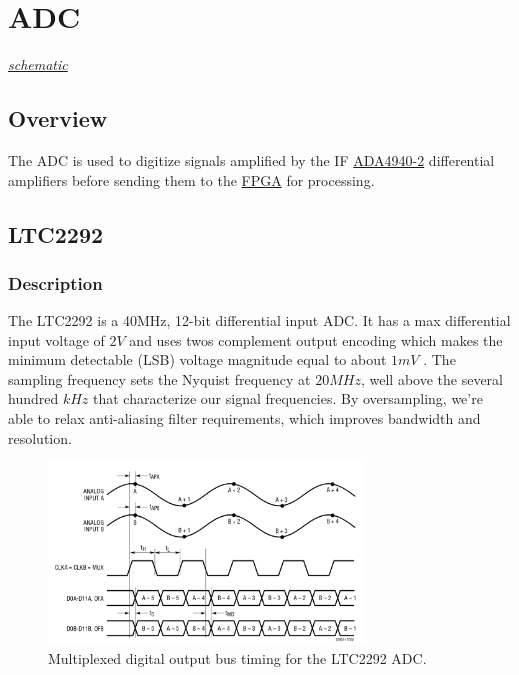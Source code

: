 \section{ADC}
\label{sec:adc}
\textit{\hyperlink{schematic.4}{schematic}}

\subsection{Overview}
\label{sec:adc-overview}

The ADC is used to digitize signals amplified by the IF \hyperref[sec:ada4940-2]{ADA4940-2}
differential amplifiers before sending them to the \hyperref[sec:xc7a15t-ftg256]{FPGA} for
processing.

\subsection{LTC2292}
\label{sec:ltc2292}

\subsubsection{Description}
\label{sec:ltc2292-description}

The LTC2292 is a 40MHz, 12-bit differential input ADC\@. It has a max differential input voltage of
$2 \si{V}$ and uses twos complement output encoding which makes the minimum detectable (LSB) voltage
magnitude equal to about $1 \si{mV}$ . The sampling frequency sets the Nyquist frequency at
$20 \si{MHz}$, well above the several hundred $\si{kHz}$ that characterize our signal
frequencies. By oversampling, we're able to relax anti-aliasing filter requirements, which improves
bandwidth and resolution.

\begin{figure}[h]
        \centering\includegraphics[width=0.75\textwidth]{data/LTC2292-multiplex.png}
        \caption{Multiplexed digital output bus timing for the LTC2292 ADC.}
        \label{fig:ltc2292-multiplex}
\end{figure}

